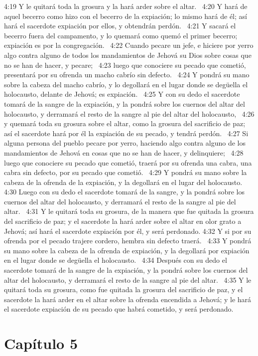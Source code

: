 4:19 Y le quitará toda la grosura y la hará arder sobre el altar.  
4:20 Y hará de aquel becerro como hizo con el becerro de la expiación; lo mismo hará de él; así hará el sacerdote expiación por ellos, y obtendrán perdón.  
4:21 Y sacará el becerro fuera del campamento, y lo quemará como quemó el primer becerro; expiación es por la congregación.  
4:22 Cuando pecare un jefe, e hiciere por yerro algo contra alguno de todos los mandamientos de Jehová su Dios sobre cosas que no se han de hacer, y pecare;  
4:23 luego que conociere su pecado que cometió, presentará por su ofrenda un macho cabrío sin defecto.  
4:24 Y pondrá su mano sobre la cabeza del macho cabrío, y lo degollará en el lugar donde se degüella el holocausto, delante de Jehová; es expiación.  
4:25 Y con su dedo el sacerdote tomará de la sangre de la expiación, y la pondrá sobre los cuernos del altar del holocausto, y derramará el resto de la sangre al pie del altar del holocausto,  
4:26 y quemará toda su grosura sobre el altar, como la grosura del sacrificio de paz; así el sacerdote hará por él la expiación de su pecado, y tendrá perdón.  
4:27 Si alguna persona del pueblo pecare por yerro, haciendo algo contra alguno de los mandamientos de Jehová en cosas que no se han de hacer, y delinquiere;  
4:28 luego que conociere su pecado que cometió, traerá por su ofrenda una cabra, una cabra sin defecto, por su pecado que cometió.  
4:29 Y pondrá su mano sobre la cabeza de la ofrenda de la expiación, y la degollará en el lugar del holocausto.  
4:30 Luego con su dedo el sacerdote tomará de la sangre, y la pondrá sobre los cuernos del altar del holocausto, y derramará el resto de la sangre al pie del altar.  
4:31 Y le quitará toda su grosura, de la manera que fue quitada la grosura del sacrificio de paz; y el sacerdote la hará arder sobre el altar en olor grato a Jehová; así hará el sacerdote expiación por él, y será perdonado. 
4:32 Y si por su ofrenda por el pecado trajere cordero, hembra sin defecto traerá.  
4:33 Y pondrá su mano sobre la cabeza de la ofrenda de expiación, y la degollará por expiación en el lugar donde se degüella el holocausto.  
4:34 Después con su dedo el sacerdote tomará de la sangre de la expiación, y la pondrá sobre los cuernos del altar del holocausto, y derramará el resto de la sangre al pie del altar.  
4:35 Y le quitará toda su grosura, como fue quitada la grosura del sacrificio de paz, y el sacerdote la hará arder en el altar sobre la ofrenda encendida a Jehová; y le hará el sacerdote expiación de su pecado que habrá cometido, y será perdonado.  
\section*{Capítulo 5 }

